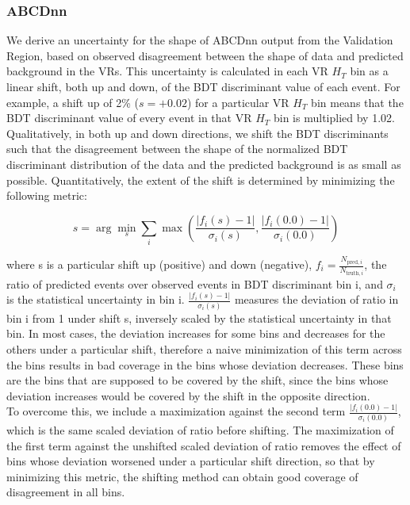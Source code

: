 \documentclass[twoside]{article}
\begin{document}
\subsubsection{ABCDnn}
\label{sec:systabcdnn}
We derive an uncertainty for the shape of ABCDnn output from the Validation Region, based on observed disagreement between the shape of data and predicted background in the VRs. This uncertainty is calculated in each VR $H_T$ bin as a linear shift, both up and down, of the BDT discriminant value of each event. For example, a shift up of 2\% ($s=+0.02$) for a particular VR $H_T$ bin means that the BDT discriminant value of every event in that VR $H_T$ bin is multiplied by 1.02. Qualitatively, in both up and down directions, we shift the BDT discriminants such that the disagreement between the shape of the normalized BDT discriminant distribution of the data and the predicted background is as small as possible. Quantitatively, the extent of the shift is determined by minimizing the following metric:

\[
s = \arg\min_s \sum_i \max\left(\frac{|f_i(s) - 1|}{\sigma_i(s)}, \frac{|f_i(0.0) - 1|}{\sigma_i(0.0)}\right)
\]

where s is a particular shift up (positive) and down (negative), $f_i = \frac{N_{\text{pred}, i}}{N_{\text{truth}, i}}$, the ratio of predicted events over observed events in BDT discriminant bin i, and $\sigma_i$ is the statistical uncertainty in bin i. $\frac{|f_i(s) - 1|}{\sigma_i(s)}$ measures the deviation of ratio in bin i from 1 under shift s, inversely scaled by the statistical uncertainty in that bin. In most cases, the deviation increases for some bins and decreases for the others under a particular shift, therefore a naive minimization of this term across the bins results in bad coverage in the bins whose deviation decreases. These bins are the bins that are supposed to be covered by the shift, since the bins whose deviation increases would be covered by the shift in the opposite direction.\\ 

To overcome this, we include a maximization against the second term
$\frac{|f_i(0.0) - 1|}{\sigma_i(0.0)}$, which is the same scaled deviation of ratio before shifting. The maximization of the first term against the unshifted scaled deviation of ratio removes the effect of bins whose deviation worsened under a particular shift direction, so that by minimizing this metric, the shifting method can obtain good coverage of disagreement in all bins.\\
\end{document}
